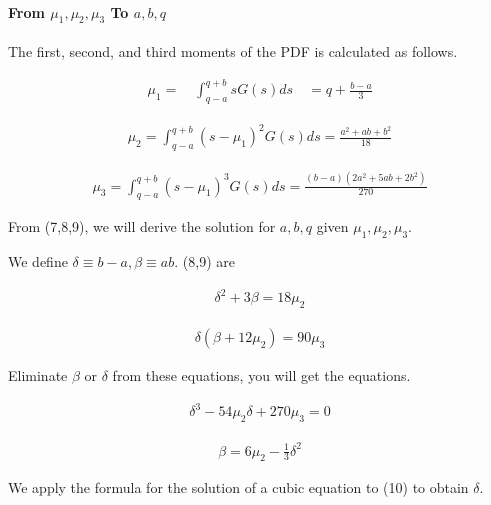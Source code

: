 \hypertarget{from-mu_1-mu_2-mu_3-to-abq}{%
\paragraph{\texorpdfstring{From \(\mu_{1}, \mu_{2}, \mu_{3}\) To
\(a,b,q\)}{From \textbackslash mu\_\{1\}, \textbackslash mu\_\{2\}, \textbackslash mu\_\{3\} To a,b,q}}\label{from-mu_1-mu_2-mu_3-to-abq}}

The first, second, and third moments of the PDF is calculated as
follows.

\begin{eqnarray}
\mu_{1}=\quad \int_{q-a}^{q+b}sG(s)ds \quad=q+\frac{b-a}{3}
\label{E08-7}
\end{eqnarray}

\begin{eqnarray}
\mu_{2}=\int_{q-a}^{q+b}\left(s-\mu_{1}\right)^{2} G(s)ds=\frac{a^{2}+a b+b^{2}}{18}
\label{E08-8}
\end{eqnarray}

\begin{eqnarray}
\mu_{3}=\int_{q-a}^{q+b}\left(s-\mu_{1}\right)^{3} G(s)ds=\frac{(b-a)\left(2 a^{2}+5 a b+2 b^{2}\right)}{270}
\label{E08-9}
\end{eqnarray}

From (7,8,9), we will derive the solution for \(a,b , q\) given
\(\mu_{1}, \mu_{2}, \mu_{3}\).

We define \(\delta \equiv b-a, \beta \equiv a b\). (8,9) are

\begin{eqnarray}
\delta^{2}+3 \beta=18 \mu_{2}
\end{eqnarray}

\begin{eqnarray}
\delta\left(\beta+12 \mu_{2}\right)=90 \mu_{3}
\end{eqnarray}

Eliminate \(\beta\) or \(\delta\) from these equations, you will get the
equations.

\begin{eqnarray}
\delta^{3}-54 \mu_{2} \delta+270 \mu_{3}=0
\label{E08-10}
\end{eqnarray}

\begin{eqnarray}
\beta=6 \mu_{2}-\frac{1}{3} \delta^{2}
\label{E08-11}
\end{eqnarray}

We apply the formula for the solution of a cubic equation to (10) to
obtain \(\delta\).

